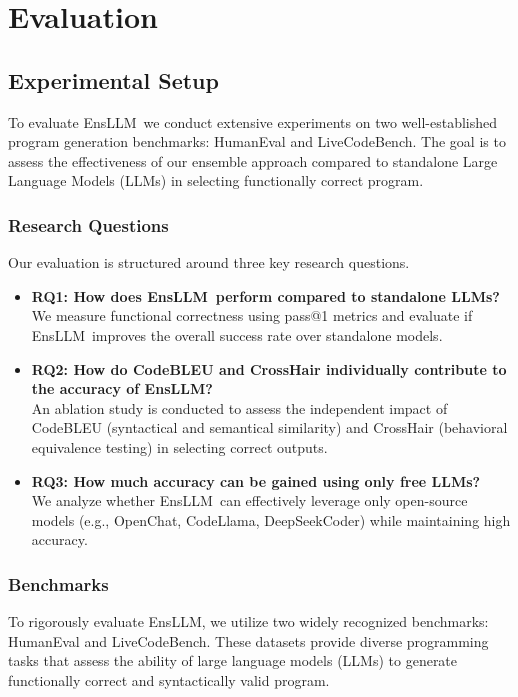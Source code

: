 \documentclass{article}
\newcommand{\tool}{EnsLLM}
\begin{document}
\section{Evaluation}

\subsection{Experimental Setup}
To evaluate \tool\, we conduct extensive experiments on two well-established program generation benchmarks: HumanEval and LiveCodeBench. The goal is to assess the effectiveness of our ensemble approach compared to standalone Large Language Models (LLMs) in selecting functionally correct program.

\subsubsection{Research Questions}
Our evaluation is structured around three key research questions.
\begin{itemize}
    \item
{\textbf{RQ1: How does \tool\ perform compared to standalone LLMs?}} 
    \\ We measure functional correctness using pass@1 metrics and evaluate if \tool\ improves the overall success rate over standalone models.
    \item
{\textbf {RQ2: How do CodeBLEU and CrossHair individually contribute to the accuracy of \tool?}} 
    \\ An ablation study is conducted to assess the independent impact of CodeBLEU (syntactical and semantical similarity) and CrossHair (behavioral equivalence testing) in selecting correct outputs.
    \item
{\textbf{RQ3: How much accuracy can be gained using only free LLMs?}} 
    \\ We analyze whether \tool\ can effectively leverage only open-source models (e.g., OpenChat, CodeLlama, DeepSeekCoder) while maintaining high accuracy.
\end{itemize}

\subsubsection{Benchmarks}
\leavevmode\par
To rigorously evaluate \tool, we utilize two widely recognized benchmarks: HumanEval and LiveCodeBench. These datasets provide diverse programming tasks that assess the ability of large language models (LLMs) to generate functionally correct and syntactically valid program.
\end{document}
